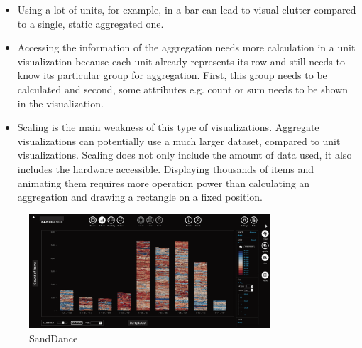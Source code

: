 \begin{itemize}
\item Using a lot of units, for example, in a bar can lead to visual clutter compared to a single, static aggregated one.

\item Accessing the information of the aggregation needs more calculation in a unit visualization because each unit already represents its row and still needs to know its particular group for aggregation. First, this group needs to be calculated and second, some attributes e.g. count or sum needs to be shown in the visualization.

\item Scaling is the main weakness of this type of visualizations. Aggregate visualizations can potentially use a much larger dataset, compared to unit visualizations. Scaling does not only include the amount of data used, it also includes the hardware accessible. Displaying thousands of items and animating them requires more operation power than calculating an aggregation and drawing a rectangle on a fixed position.

\end{itemize}

\begin{figure}[!htb]
\centering
\includegraphics[width=0.8\textwidth,keepaspectratio]{images/methods/related/sanddance.png}
\caption[
    Concept of SandDance .
]{SandDance}
\label{fig:sanddance}
\end{figure}

